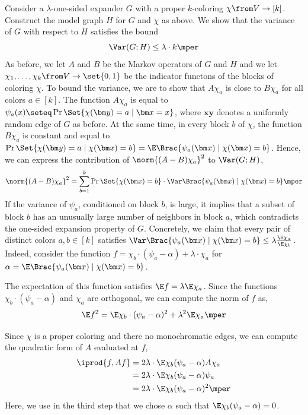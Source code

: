 Consider a \(\lambda\)-one-sided expander \(G\) with a proper \(k\)-coloring \(\chi\from V\to [k]\).
Construct the model graph \(H\) for \(G\) and \(\chi\) as above.
We show that the variance of \(G\) with respect to \(H\) satisfies the bound
\begin{equation}
  \Var(G;H) \le \lambda \cdot k
  \mper
\end{equation}
As before, we let \(A\) and \(B\) be the Markov operators of \(G\) and \(H\) and we let \(\chi_{1},\ldots,\chi_{k}\from V\to \set{0,1}\) be the indicator functons of the blocks of coloring \(\chi\).
To bound the variance, we are to show that \(A\chi_{a}\) is close to \(B\chi_{a}\) for all colors \(a\in [k]\).
The function \(A\chi_{a}\) is equal to \(\psi_{a}(x)\seteq \Pr\Set{\chi(\bm y)=a \mid \bm x=x}\),
where \(\bm x \bm y\) denotes a uniformly random edge of \(G\) as before.
At the same time, in every block \(b\) of \(\chi\), the function \(B\chi_{a}\) is constant and equal to \(\Pr\Set{\chi(\bm y)=a\mid \chi(\bm x)=b}=\E\Brac{\psi_{a}(\bm x) \mid \chi(\bm x)=b}\).
Hence, we can express the contribution of \(\norm{(A-B)\chi_{a}}^{2}\) to \(\Var(G;H)\),
\begin{equation}
  \norm{(A-B)\chi_{a}}^{2}
  = \sum_{b=1}^{k}\Pr\Set{\chi(\bm x)=b}
  \cdot \Var\Brac{\psi_{a}(\bm x) \mid \chi(\bm x)=b}
  \mper
\end{equation}
If the variance of \(\psi_{a}\), conditioned on block \(b\), is large,
it implies that a subset of block \(b\) has an unusually large number of neighbors in block \(a\),
which contradicts the one-sided expansion property of \(G\).
Concretely, we claim that every pair of distinct colors \(a,b\in[k]\) satisfies \(\Var\Brac{\psi_{a}(\bm x) \mid \chi(\bm x)=b}\le \lambda \tfrac{\E \chi_{a}}{\E \chi_{b}}\).
Indeed, consider the function \(f=\chi_{b}\cdot (\psi_{a}-\alpha)+\lambda\cdot \chi_{a}\) for \(\alpha=\E\Brac{\psi_{a}(\bm x)\mid \chi(\bm x)=b}\).

The expectation of this function satisfies \(\E f = \lambda \E\chi_{a}\).
Since the functions \(\chi_{b}\cdot (\psi_{a}-\alpha)\) and \(\chi_{a}\) are orthogonal, we can compute the norm of \(f\) as,
\begin{equation}
  \E f^{2}= \E \chi_{b}\cdot(\psi_{a}-\alpha)^{2} + \lambda^{2}\E\chi_{a}
  \mper
\end{equation}


Since \(\chi\) is a proper coloring and there no monochromatic edges, we can compute the quadratic form of \(A\) evaluated at \(f\),
\begin{align}
  \iprod{f,Af}
  &=2\lambda \cdot\E \chi_{b} (\psi_{a}-\alpha) A\chi_{a} \\
  &=2\lambda \cdot\E \chi_{b} (\psi_{a}-\alpha) \psi_{a} \\
  &=2\lambda \cdot\E \chi_{b} (\psi_{a}-\alpha)^{2}
    \mper
\end{align}
Here, we use in the third step that we chose \(\alpha\) such that \(\E \chi_{b}(\psi_{a}-\alpha)=0\).
  
